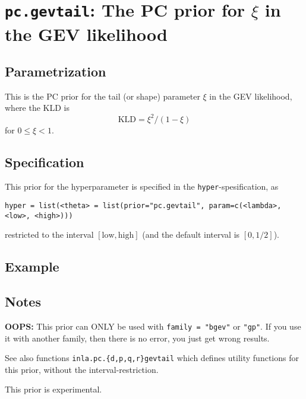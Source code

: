 \documentclass[a4paper,11pt]{article}
\begin{document}
\section*{\texttt{pc.gevtail}: The PC prior for $\xi$ in the GEV likelihood}

\subsection*{Parametrization}

This is the PC prior for the tail (or shape) parameter $\xi$ in the
GEV likelihood, where the KLD is
\begin{displaymath}
    \text{KLD} = \xi^{2}/(1-\xi)
\end{displaymath}
for $0 \le \xi < 1$.

\subsection*{Specification}
This prior for the hyperparameter is specified in the
\texttt{hyper}-spesification, as
\begin{center}
    \texttt{hyper = list(<theta> = list(prior="pc.gevtail", param=c(<lambda>, <low>, <high>)))}
\end{center}
restricted to the interval $[\text{low}, \text{high}]$ (and the
default interval is $[0,1/2]$).

\subsection*{Example}

\subsection*{Notes}

\textbf{OOPS:} This prior can ONLY be used with \texttt{family =
    "bgev"} or \texttt{"gp"}. If you use it with another family, then
there is no error, you just get wrong results.

See also functions \texttt{inla.pc.\{d,p,q,r\}gevtail} which defines
utility functions for this prior, without the interval-restriction.

This prior is experimental.
\end{document}
